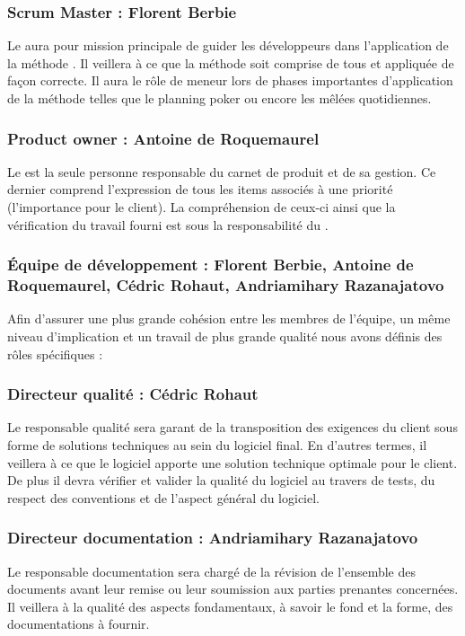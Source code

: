 \subsubsection{Scrum Master : Florent Berbie}
Le  aura pour mission principale de guider les développeurs dans l'application de la méthode . Il veillera à ce que la méthode soit
comprise de tous et appliquée de façon correcte. Il aura le rôle de meneur lors de phases importantes d’application de la méthode telles que le
planning poker ou encore les mêlées quotidiennes.
\subsubsection{Product owner : Antoine de Roquemaurel}
Le  est la seule personne responsable du carnet de produit et de sa gestion. Ce dernier comprend l’expression de tous les items associés
à une priorité (l'importance pour le client). La compréhension de ceux-ci ainsi que la vérification du travail fourni est sous la responsabilité du
.
\subsubsection{Équipe de développement : Florent Berbie, Antoine de Roquemaurel, Cédric Rohaut, Andriamihary Razanajatovo}
Afin d’assurer une plus grande cohésion entre les membres de l’équipe, un même niveau d’implication et un travail de plus grande qualité nous avons
définis des rôles spécifiques : 
\subsubsection{Directeur qualité : Cédric Rohaut}
Le responsable qualité sera garant de la transposition des exigences du client sous forme de solutions techniques au sein du logiciel final. En
d’autres termes, il veillera à ce que le logiciel apporte une solution technique optimale pour le client. De plus il devra vérifier et valider la
qualité du logiciel au travers de tests, du respect des conventions et de l'aspect général du logiciel.

\subsubsection{Directeur documentation : Andriamihary Razanajatovo}
Le responsable documentation sera chargé de la révision de l'ensemble des documents avant leur remise ou leur soumission aux parties prenantes
concernées. Il veillera à la qualité des aspects fondamentaux, à savoir le fond et la forme, des documentations à fournir.

